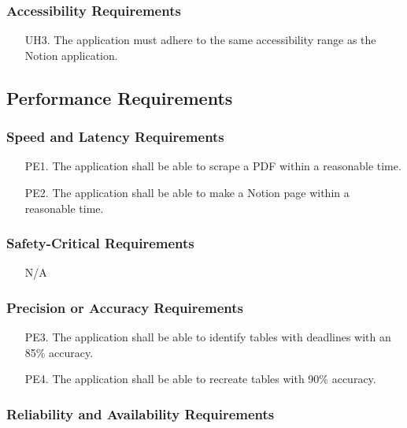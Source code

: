 \documentclass[12pt, titlepage]{article}
\begin{document}
\subsubsection{Accessibility Requirements}

\begin{itemize}
  \item[UH3.] The application must adhere to the same accessibility range as the Notion application. 
\end{itemize}

\subsection{Performance Requirements}

\subsubsection{Speed and Latency Requirements}

\begin{itemize}
  \item[PE1.] The application shall be able to scrape a PDF within a reasonable time. 
  \item[PE2.] The application shall be able to make a Notion page within a reasonable time. 
\end{itemize}

\subsubsection{ Safety-Critical Requirements}

\begin{itemize}
  \item[] N/A
\end{itemize}

\subsubsection{ Precision or Accuracy Requirements}

\begin{itemize}
  \item[PE3.] The application shall be able to identify tables with deadlines with an 85\% accuracy.
  \item[PE4.] The application shall be able to recreate tables with 90\% accuracy.
\end{itemize}

\subsubsection{ Reliability and Availability Requirements }
\end{document}

